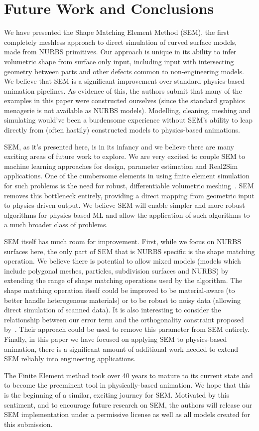 \section{Future Work and Conclusions}
We have presented the Shape Matching Element Method (SEM), the first completely meshless approach to direct simulation of curved surface models, made from NURBS primitives.
Our approach is unique in its ability to infer volumetric shape from surface only input,
including input with intersecting geometry between parts and other defects common to non-engineering models.
We believe that SEM is a significant improvement over standard physics-based animation pipelines. 
As evidence of this, the authors submit that many of the examples in this paper were constructed ourselves
(since the standard graphics menagerie is not available as NURBS models). 
Modelling, cleaning, meshing and simulating would've been a burdensome experience without SEM's
ability to leap directly from (often hastily) constructed models to physics-based animations.

SEM, as it's presented here, is in its infancy and we believe there are many exciting areas of future work to explore.
We are very excited to couple SEM to machine learning approaches for design, parameter estimation and Real2Sim applications.
One of the cumbersome elements in using finite element simulation for such problems is the need for robust, differentiable volumetric meshing~\cite{gao2020deftet}.
SEM removes this bottleneck entirely, providing a direct mapping from geometric input to physics-driven output. 
We believe SEM will enable simpler and more robust algorithms for  physics-based ML and 
allow the application of such algorithms to a much broader class of problems. 

SEM itself has much room for improvement. 
First, while we focus on NURBS surfaces here, the only part of SEM that is NURBS specific is the shape matching operation.
We believe there is potential to allow mixed models (models which include polygonal meshes, particles, subdivision surfaces and NURBS)
by extending the range of shape matching operations used by the algorithm. The shape matching operation itself could be improved to be material-aware 
(to better handle heterogenous materials) or to be robust to noisy data (allowing direct simulation of scanned data). 
It is also interesting to consider the relationship between our error term and the orthogonality constraint proposed by~\citet{Zhang:CompDynamics:2020}. 
Their approach could be used to remove this parameter from SEM entirely.
Finally, in this paper we have focused on applying SEM to physics-based animation, there is a significant amount of additional work needed to 
extend SEM reliably into engineering applications.

The Finite Element method took over 40 years to mature to its current state and to become the preeminent tool in physically-based animation.
We hope that this is the beginning of a similar, exciting journey for SEM. 
Motivated by this sentiment, and to encourage future research on SEM, the authors will release our SEM implementation 
under a permissive license as well as all models created for this submission.
